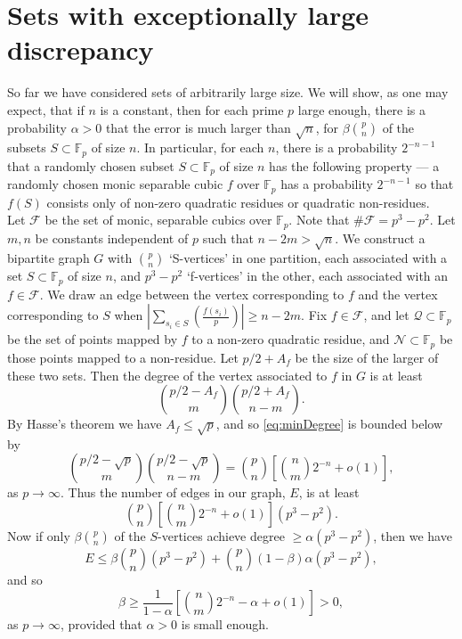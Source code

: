 \documentclass{amsart}
\theoremstyle{plain}
\theoremstyle{definition}
\newcommand{\legendre}[2]{\genfrac{(}{)}{}{}{#1}{#2}}
\newcommand{\Fp}{\mathbb{F}_p}
\begin{document}
\section{Sets with exceptionally large discrepancy}

So far we have considered sets of arbitrarily large size. We will show, as one may expect, that if $n$ is a constant, then for each prime $p$ large enough, there is a probability $\alpha>0$ that the error is much larger than $\sqrt{n}$, for $\beta\binom{p}{n}$ of the subsets $S\subset\Fp$ of size $n$. In particular, for each $n$, there is a probability $2^{-n-1}$ that a randomly chosen subset $S\subset\Fp$ of size $n$ has the following property --- a randomly chosen monic separable cubic $f$ over $\Fp$ has a probability $2^{-n-1}$ so that $f(S)$ consists only of non-zero quadratic residues or quadratic non-residues.\\

Let $\mathcal F$ be the set of monic, separable cubics over $\Fp$. Note that $\#\mathcal F = p^3-p^2$. Let $m,n$ be constants independent of $p$ such that $n-2m>\sqrt{n}$. We construct a bipartite graph $G$ with $\binom{p}{n}$ `S-vertices' in one partition, each associated with a set $S \subset \Fp$ of size $n$, and $p^3 - p^2$ `f-vertices' in the other, each associated with an $f \in \mathcal F$. We draw an edge between the vertex corresponding to $f$ and the vertex corresponding to $S$ when $\left| \sum_{s_i \in S} \legendre{f(s_i)}{p} \right| \geq n-2m$. Fix $f \in \mathcal F$, and let $\mathcal Q\subset\Fp$ be the set of points mapped by $f$ to a non-zero quadratic residue, and $\mathcal N\subset\Fp$ be those points mapped to a non-residue. Let $p/2+A_f$ be the size of the larger of these two sets. Then the degree of the vertex associated to $f$ in $G$ is at least
\begin{equation}
\label{eq:minDegree}
 \binom{p/2 - A_f}{m} \binom{ p/2 + A_f }{n-m}.
\end{equation}
By Hasse's theorem we have $A_f \leq \sqrt{p}$, and so \eqref{eq:minDegree} is bounded below by
\[
\binom{p/2 - \sqrt{p} }{m} \binom{p/2 -\sqrt{p} }{n-m}=\binom{p}{n}\left[\binom{n}{m}2^{-n}+o(1)\right],
\]
as $p\to\infty$.
Thus the number of edges in our graph, $E$, is at least
\[
\binom{p}{n}\left[\binom{n}{m}2^{-n}+o(1)\right](p^3 - p^2).
\]
Now if only $\beta\binom{p}{n}$ of the $S$-vertices achieve degree $\geq \alpha(p^3 - p^2)$, then we have
\[
E \leq \beta \binom{p}{n}(p^3-p^2) + \binom{p}{n}(1-\beta)\alpha (p^3 - p^2),
\]
and so
\[
\beta\geq\dfrac{1}{1-\alpha}\left[\binom{n}{m}2^{-n}-\alpha+o(1)\right]>0,
\]
as $p\to\infty$, provided that $\alpha>0$ is small enough.



\end{document}
